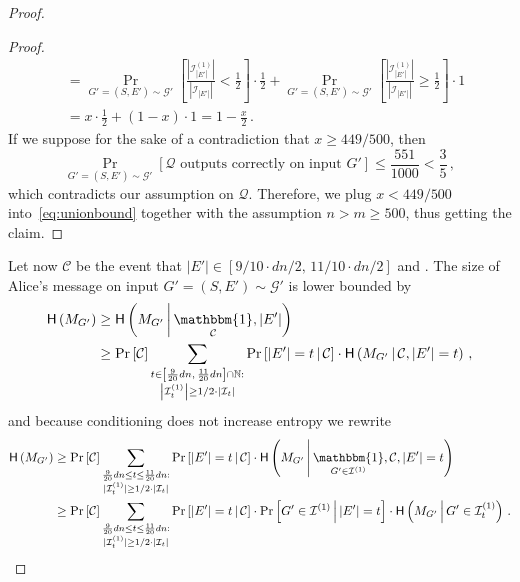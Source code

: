 \documentclass[epsfig,letter,11pt]{article}
\numberwithin{equation}{section}
\DeclareMathOperator{\ind}{\mathbbm{1}}
\newcommand{\I}{\mathcal{I}}
\newcommand*{\entropy}{\textup{\textsf{H}}}
\begin{document}
\begin{proof}
\begin{proof}
\begin{align*}
		 	& = \Pr_{G'=(S,E') \sim \mathcal{G}'}\left[  \frac{\left|\I_{|E'|}^{(1)}\right|}{\left|\I_{|E'| }\right|} < \frac{1}{2} \right] \cdot \frac{1}{2} + \Pr_{G'=(S,E') \sim \mathcal{G}'}\left[ \frac{\left|\I_{|E'|}^{(1)}\right|}{\left|\I_{|E'| }\right|} \ge \frac{1}{2}\right] \cdot 1\\
		 	& = x \cdot \frac{1}{2} + (1-x) \cdot 1 = 1-\frac{x}{2}\, .
		 \end{align*}
		 If we suppose for the sake of a contradiction that $x \ge 449/500$, then
		 \begin{equation*}
		 	\Pr_{G'=(S,E') \sim \mathcal{G}'}\left[\mathcal{Q} \text{ outputs correctly on input } G'\right] \le \frac{551}{1000} < \frac{3}{5} \, ,
		 \end{equation*}
		 which contradicts our assumption on $\mathcal{Q}$. Therefore, we plug $x < 449/500$ into~\eqref{eq:unionbound} together with the assumption $n > m \ge 500$, thus  getting the claim.
	\end{proof}
	\noindent
	Let now $\mathcal{C}$ be the event that $|E'| \in [9/10 \cdot dn/2 , \, 11/10 \cdot dn/2]$ and  .
	The size of Alice's message on input $G'=(S,E') \sim \mathcal{G}'$ is lower bounded by
	\begin{align*}
			\entropy\left(M_{G'}\right)
			& \ge \entropy\left(M_{G'} \, \middle| \, \ind_{ \mathcal{C}}, |E'|\right)  \\
			& \ge\Pr\left[  \mathcal{C} \right]    \sum_{\substack{t \in  \left[\frac{9}{20}dn , \, \frac{11}{20}dn\right] \cap \mathbb{N}:\\ \left|\mathcal{I}^{(1)}_{t}\right| \ge {1}/{2} \cdot \left|\mathcal{I}_t\right| } } \Pr\left[|E'|=t \, \middle| \, \mathcal{C} \right] \cdot \entropy\left(M_{G'} \, \middle| \, {\mathcal{C}}, |E'|=t\right) \,,
		\end{align*}
		and because conditioning does not increase entropy we rewrite
		\begin{align*}
				\entropy\left(M_{G'}\right) & \ge\Pr\left[  \mathcal{C} \right]     \sum_{\substack{\frac{9}{20}dn \le t \le  \frac{11}{20}dn :\\ |\mathcal{I}^{(1)}_{t}| \ge {1}/{2} \cdot |\mathcal{I}_t| } }\Pr\left[|E'|=t \, \middle| \, \mathcal{C} \right] \cdot \entropy\left(M_{G'} \, \middle| \, \ind_{G' \in  \I^{(1)}} ,{\mathcal{C}}, |E'|=t\right)  \\
			& \ge\Pr\left[  \mathcal{C} \right]     \sum_{\substack{\frac{9}{20}dn \le t \le  \frac{11}{20}dn:\\ |\mathcal{I}^{(1)}_{t}| \ge {1}/{2} \cdot |\mathcal{I}_t| } }\Pr\left[|E'|=t \, \middle| \, \mathcal{C} \right] \cdot \Pr\left[G' \in  \I^{(1)} \, \middle| \,  |E'|=t\right] \cdot\entropy\left(M_{G'} \, \middle| \, { G' \in \I_t^{(1)}}\right) \, .

\end{align*}
\end{proof}
\end{document}
